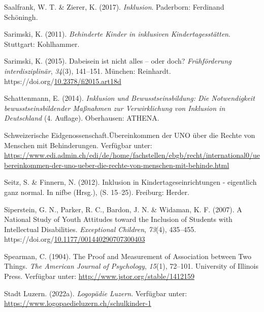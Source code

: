 \documentclass[
  ngerman,
  11pt,
  paper=a4,
  twoside,
  titlepage=true,
  openright,
  abstract=on,
  toc=listofnumbered,
  numbers=noenddot,
  chapterprefix=true,
  headings=optiontohead,
  svgnames,
  dvipsnames]{scrreprt}
\newlength{\cslhangindent}
\newlength{\cslentryspacingunit} %
\newenvironment{CSLReferences}[2] %
 {%
  \setlength{\parindent}{0pt}
  \ifodd #1
  \let\oldpar\par
  \def\par{\hangindent=\cslhangindent\oldpar}
  \fi
  \setlength{\parskip}{#2\cslentryspacingunit}
 }%
 {}
\begin{document}
\begin{CSLReferences}{1}{0}
\leavevmode{}%
Saalfrank, W. T. \& Zierer, K. (2017). \emph{Inklusion}. Paderborn:
Ferdinand Schöningh.

\leavevmode{}%
Sarimski, K. (2011). \emph{Behinderte Kinder in inklusiven
Kindertagesstätten}. Stuttgart: Kohlhammer.

\leavevmode{}%
Sarimski, K. (2015). Dabeisein ist nicht alles – oder doch?
\emph{Frühförderung interdisziplinär}, \emph{34}(3), 141–151. München:
Reinhardt.
https://doi.org/\href{https://doi.org/10.2378/fi2015.art18d}{10.2378/fi2015.art18d}

\leavevmode{}%
Schattenmann, E. (2014). \emph{Inklusion und {Bewusstseinsbildung}:
{Die} {Notwendigkeit} bewusstseinsbildender {Maßnahmen} zur
{Verwirklichung} von {Inklusion} in {Deutschland}} (4. Auflage).
Oberhausen: ATHENA.

\leavevmode{}%
Schweizerische Eidgenossenschaft.Übereinkommen der UNO über die Rechte
von Menschen mit Behinderungen. Verfügbar unter:
\url{https://www.edi.admin.ch/edi/de/home/fachstellen/ebgb/recht/international0/uebereinkommen-der-uno-ueber-die-rechte-von-menschen-mit-behinde.html}

\leavevmode{}%
Seitz, S. \& Finnern, N. (2012). Inklusion in Kindertageseinrichtungen -
eigentlich ganz normal. In nifbe (Hrsg.), (S. 15–25). Freiburg: Herder.

\leavevmode{}%
Siperstein, G. N., Parker, R. C., Bardon, J. N. \& Widaman, K. F.
(2007). A National Study of Youth Attitudes toward the Inclusion of
Students with Intellectual Disabilities. \emph{Exceptional Children},
\emph{73}(4), 435–455.
https://doi.org/\href{https://doi.org/10.1177/001440290707300403}{10.1177/001440290707300403}

\leavevmode{}%
Spearman, C. (1904). The Proof and Measurement of Association between
Two Things. \emph{The American Journal of Psychology}, \emph{15}(1),
72–101. University of Illinois Press. Verfügbar unter:
\url{http://www.jstor.org/stable/1412159}

\leavevmode{}%
Stadt Luzern. (2022a). \emph{Logopädie Luzern}. Verfügbar unter:
\url{https://www.logopaedieluzern.ch/schulkinder-1}


\end{CSLReferences}
\end{document}

